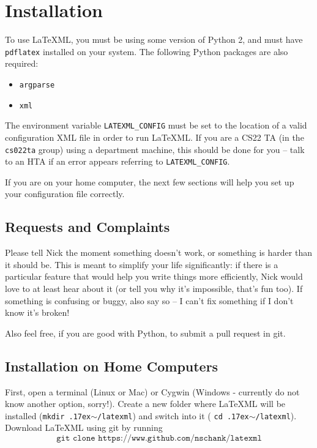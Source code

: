 \section{Installation}
  To use \LaTeX ML, you must be using some version of Python 2, and must have 
  \texttt{pdflatex} installed on your system. The following Python packages are 
  also required:
  
  \begin{itemize}\itemsep0pt
    \item \texttt{argparse}
    \item \texttt{xml}
  \end{itemize}
  
  The environment variable \texttt{LATEXML\_CONFIG} must be set to the location 
  of a valid configuration XML file in order to run \LaTeX ML. If you are a CS22
  TA (in the \texttt{cs022ta} group) using a department machine, this should be
  done for you -- talk to an HTA if an error appears referring to 
  \texttt{LATEXML\_CONFIG}.
  
  If you are on your home computer, the next few sections will help you set up 
  your configuration file correctly.
  
  \subsection{Requests and Complaints}
    Please tell Nick the moment something doesn't work, or something is harder
    than it should be. This is meant to simplify your life significantly: if
    there is a particular feature that would help you write things more 
    efficiently, Nick would love to at least hear about it (or tell you 
    why it's impossible, that's fun too). If something is confusing or 
    buggy, also say so -- I can't fix something if I don't know it's broken!
    
    Also feel free, if you are good with Python, to submit a pull request 
    in git.
    
  \subsection{Installation on Home Computers}  
    \newcommand\mytilde{\raise.17ex\hbox{$\scriptstyle\sim$}}
    \newcommand\ttquote{\texttt{\char`\"}}
  
    First, open a terminal (Linux or Mac) or Cygwin (Windows - currently do not
    know another option, sorry!). Create a new folder where \LaTeX ML will 
    be installed (\texttt{mkdir \mytilde/latexml}) and switch into it (
    \texttt{cd \mytilde/latexml}). Download \LaTeX ML using git by running 
    \[\texttt{git clone https://www.github.com/nschank/latexml}\]
    
